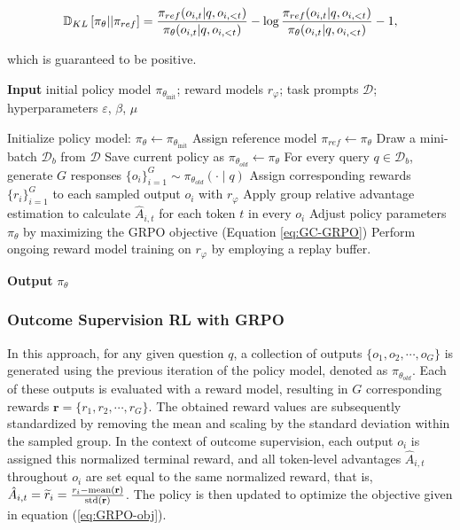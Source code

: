 \begin{itemize}[topsep=0pt]
\begin{itemize}[topsep=0pt]
\begin{equation}
\small
    \mathbb{D}_{KL}\left[\pi_{\theta} || \pi_{ref}\right] = \frac{\pi_{ref}(o_{i,t}|q,o_{i,<t})}{\pi_{\theta}(o_{i,t}|q,o_{i,<t})}- \log\frac{\pi_{ref}(o_{i,t}|q,o_{i,<t})}{\pi_{\theta}(o_{i,t}|q,o_{i,<t})} - 1,
\end{equation}

which is guaranteed to be positive.

\begin{algorithm}[t]
  \small
  \caption{Iterative Group Relative Policy Optimization}
  \textbf{Input} initial policy model $\pi_{\theta_{\text{init}}}$; reward models $r_\varphi$; task prompts $\mathcal{D}$; 
  hyperparameters $\varepsilon$, $\beta$, $\mu$
  \begin{algorithmic}[1]
    \State Initialize policy model: $\pi_\theta \leftarrow \pi_{\theta_{\text{init}}}$
       \State Assign reference model $\pi_{ref} \leftarrow \pi_{\theta}$
      \State Draw a mini-batch $\mathcal{D}_b$ from $\mathcal{D}$
      \State Save current policy as $\pi_{\theta_{old}} \leftarrow \pi_{\theta}$ 
      \State For every query $q \in \mathcal{D}_b$, generate $G$ responses $\{o_i\}_{i=1}^G \sim \pi_{\theta_{old}} (\cdot \mid q)$
      \State Assign corresponding rewards $\{r_i\}_{i=1}^{G}$ to each sampled output $o_i$ with $r_{\varphi}$
      \State Apply group relative advantage estimation to calculate $\hat{A}_{i,t}$ for each token $t$ in every $o_i$
        \State Adjust policy parameters $\pi_{\theta}$ by maximizing the GRPO objective (Equation \ref{eq:GC-GRPO})
      \EndFor
    \EndFor \State Perform ongoing reward model training on $r_\varphi$ by employing a replay buffer. 
    \EndFor 
  \end{algorithmic}
  \textbf{Output} $\pi_\theta$
  \label{alg:iter-grpo}
\end{algorithm}

\subsubsection{Outcome Supervision RL with GRPO} In this approach, for any given question $q$, a collection of outputs $\{o_1, o_2, \cdots, o_G\}$ is generated using the previous iteration of the policy model, denoted as $\pi_{\theta_{old}}$. Each of these outputs is evaluated with a reward model, resulting in $G$ corresponding rewards $\mathbf{r} = \{r_1, r_2, \cdots, r_G\}$. The obtained reward values are subsequently standardized by removing the mean and scaling by the standard deviation within the sampled group. In the context of outcome supervision, each output $o_i$ is assigned this normalized terminal reward, and all token-level advantages $\hat{A}_{i, t}$ throughout $o_i$ are set equal to the same normalized reward, that is, $\hat{A}_{i, t} = \widetilde{r}_i = \frac{r_i- {\rm mean}(\mathbf{r})}{{\rm std}(\mathbf{r})}$. The policy is then updated to optimize the objective given in equation (\ref{eq:GRPO-obj}).


\end{itemize}
\end{itemize}
